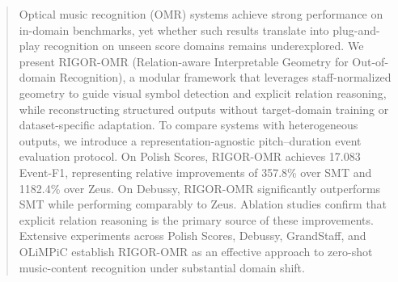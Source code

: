 \begin{abstract}
Optical music recognition (OMR) systems achieve strong performance on in-domain benchmarks, yet whether such results translate into plug-and-play recognition on unseen score domains remains underexplored. We present RIGOR-OMR (Relation-aware Interpretable Geometry for Out-of-domain Recognition), a modular framework that leverages staff-normalized geometry to guide visual symbol detection and explicit relation reasoning, while reconstructing structured outputs without target-domain training or dataset-specific adaptation. To compare systems with heterogeneous outputs, we introduce a representation-agnostic pitch--duration event evaluation protocol. On Polish Scores, RIGOR-OMR achieves 17.083 Event-F1, representing relative improvements of 357.8\% over SMT and 1182.4\% over Zeus. On Debussy, RIGOR-OMR significantly outperforms SMT while performing comparably to Zeus. Ablation studies confirm that explicit relation reasoning is the primary source of these improvements. Extensive experiments across Polish Scores, Debussy, GrandStaff, and OLiMPiC establish RIGOR-OMR as an effective approach to zero-shot music-content recognition under substantial domain shift.
\end{abstract}
